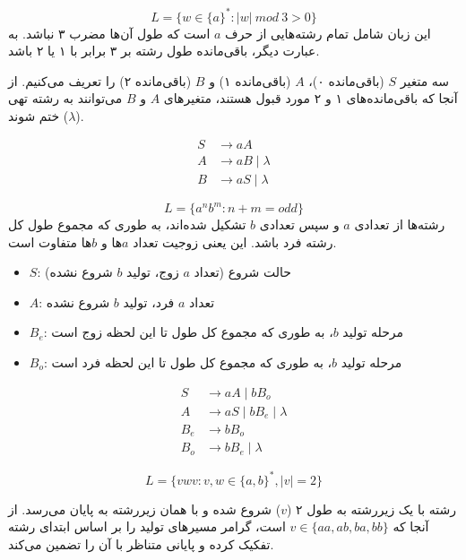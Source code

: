 \[
    L = \{w \in \{a\}^* : |w| \  mod \ 3 > 0\}
    \]
این زبان شامل تمام رشته‌هایی از حرف $a$ است که طول آن‌ها مضرب ۳ نباشد. به عبارت دیگر، باقی‌مانده طول رشته بر ۳ برابر با ۱ یا ۲ باشد. 

سه متغیر $S$ (باقی‌مانده ۰)، $A$ (باقی‌مانده ۱) و $B$ (باقی‌مانده ۲) را تعریف می‌کنیم. از آنجا که باقی‌مانده‌های ۱ و ۲ مورد قبول هستند، متغیرهای $A$ و $B$ می‌توانند به رشته تهی ($\lambda$) ختم شوند.

\[
\begin{aligned}
    S &\rightarrow aA \\
    A &\rightarrow aB \mid \lambda \\
    B &\rightarrow aS \mid \lambda
\end{aligned}
\]

\[
    L = \{a^n b^m : n + m = odd\}
    \]
رشته‌ها از تعدادی $a$ و سپس تعدادی $b$ تشکیل شده‌اند، به طوری که مجموع طول کل رشته فرد باشد. این یعنی زوجیت تعداد $a$ها و $b$ها متفاوت است.

\begin{itemize}
    \item $S$: حالت شروع (تعداد $a$ زوج، تولید $b$ شروع نشده)
    \item $A$: تعداد $a$ فرد، تولید $b$ شروع نشده
    \item $B_e$: مرحله تولید $b$، به طوری که مجموع کل طول تا این لحظه زوج است
    \item $B_o$: مرحله تولید $b$، به طوری که مجموع کل طول تا این لحظه فرد است
\end{itemize}

\[
\begin{aligned}
    S &\rightarrow aA \mid bB_o \\
    A &\rightarrow aS \mid bB_e \mid \lambda \\
    B_e &\rightarrow bB_o \\
    B_o &\rightarrow bB_e \mid \lambda
\end{aligned}
\]


\[
L = \{vwv : v, w \in \{a,b\}^*, |v| = 2\}
\]

رشته با یک زیررشته به طول ۲ ($v$) شروع شده و با همان زیررشته به پایان می‌رسد. از آنجا که $v \in \{aa, ab, ba, bb\}$ است، گرامر مسیرهای تولید را بر اساس ابتدای رشته تفکیک کرده و پایانی متناظر با آن را تضمین می‌کند.


